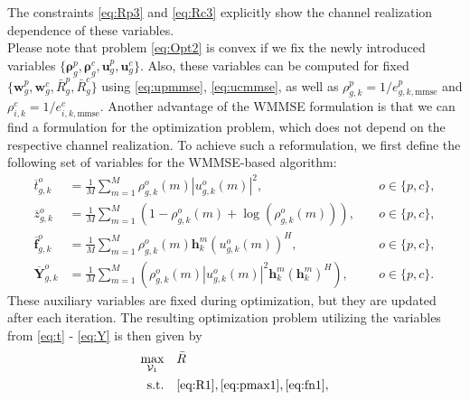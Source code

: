 \documentclass[12pt,draftcls,onecolumn]{IEEEtran}
\theoremstyle{remark}
\theoremstyle{definition}
\begin{document}
{The constraints \eqref{eq:Rp3} and \eqref{eq:Rc3} explicitly show the channel realization dependence of these variables.\\
\indent Please note that problem \eqref{eq:Opt2} is convex if we fix the newly introduced variables $\{ {\bm \rho}_g^p,{\bm \rho}_g^c,\mathbf{u}_g^p,\mathbf{u}_g^c \}$. Also, these variables can be computed for fixed $\{ \mathbf{w}_{g}^p, \mathbf{w}_{g}^c, \bar{R}_{g}^{p}, \bar{R}_{g}^{c} \}$ using \eqref{eq:upmmse}, \eqref{eq:ucmmse}, as well as $\rho_{g,k}^p = 1/e_{g,k,\text{mmse}}^p$ and $\rho_{i,k}^c = 1/e_{i,k,\text{mmse}}^c$. Another advantage of the WMMSE formulation is that we can find a formulation for the optimization problem, which does not depend on the respective channel realization. To achieve such a reformulation, we first define the following set of variables for the WMMSE-based algorithm:
\begin{align}
	\overline{t}_{g,k}^o &= \frac{1}{M} \sum_{m=1}^{M} \rho_{g,k}^o(m) \left|u_{g,k}^{o}(m)\right|^2, &&\; o \in \{p,c\}, \label{eq:t}\\
	\overline{z}_{g,k}^o &= \frac{1}{M} \sum_{m=1}^{M} \left( 1 - \rho_{g,k}^o(m) + \log( \rho_{g,k}^o(m) ) \right), &&\; o \in \{p,c\}, \label{eq:z}\\
	\overline{\mathbf{f}}_{g,k}^o &= \frac{1}{M} \sum_{m=1}^{M} \rho_{g,k}^o(m) \mathbf{h}_k^m (u_{g,k}^o(m))^H, &&\; o \in \{p,c\}, \label{eq:f} \\
	\overline{\mathbf{Y}}_{g,k}^o &= \frac{1}{M} \sum_{m=1}^{M} \left( \rho_{g,k}^o(m)\left|u_{g,k}^{o}(m)\right|^2 \mathbf{h}_k^m (\mathbf{h}_k^m)^H \right), &&\; o \in \{p,c\}. \label{eq:Y}
\end{align}
These auxiliary variables are fixed during optimization, but they are updated after each iteration. The resulting optimization problem utilizing the variables from \eqref{eq:t} - \eqref{eq:Y} is then given by
\begin{subequations}\label{eq:Opt3}
	\begin{align}
		\underset{\mathcal{V}_1}{\text{max}}\quad &\bar{R}  \\
		\text{s.t.} \quad & \eqref{eq:R1}, \eqref{eq:pmax1}, \eqref{eq:fn1}, \nonumber \\

\end{align}
\end{subequations}}
\end{document}
